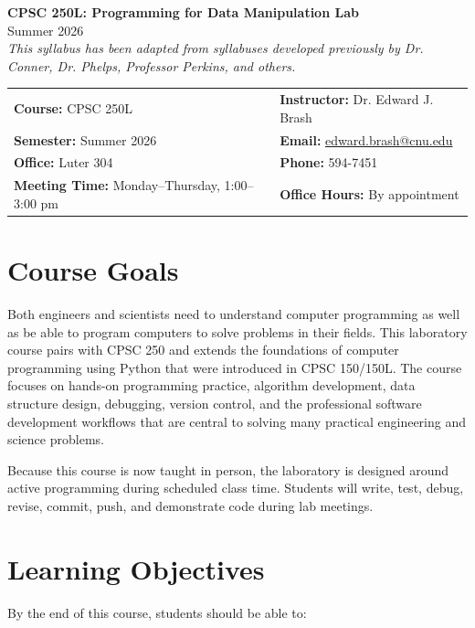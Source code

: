 \documentclass[11pt]{article}
\makeatletter
\newcommand{\coursename}{CPSC 250L: Programming for Data Manipulation Lab}
\newcommand{\semester}{Summer 2026}
\newcommand{\instructor}{Dr. Edward J. Brash}
\newcommand{\email}{edward.brash@cnu.edu}
\newcommand{\office}{Luter 304}
\newcommand{\phone}{594-7451}
\newcommand{\officehours}{By appointment}
\newcommand{\meetingtime}{Monday--Thursday, 1:00--3:00 pm}
\makeatother
\begin{document}
\begin{center}
    {\LARGE \textbf{\coursename}}\\[0.5em]
    {\large \semester}\\[0.75em]
    \textit{This syllabus has been adapted from syllabuses developed previously by Dr. Conner, Dr. Phelps, Professor Perkins, and others.}
\end{center}

\vspace{0.5em}

\begin{tabular}{@{}p{}p{}@{}}
\textbf{Course:} CPSC 250L & \textbf{Instructor:} \instructor \\
\textbf{Semester:} \semester & \textbf{Email:} \href{mailto:\email}{\email} \\
\textbf{Office:} \office & \textbf{Phone:} \phone \\
\textbf{Meeting Time:} \meetingtime & \textbf{Office Hours:} \officehours \\
\end{tabular}

\section{Course Goals}

Both engineers and scientists need to understand computer programming as well as be able to program computers to solve problems in their fields. This laboratory course pairs with CPSC 250 and extends the foundations of computer programming using Python that were introduced in CPSC 150/150L. The course focuses on hands-on programming practice, algorithm development, data structure design, debugging, version control, and the professional software development workflows that are central to solving many practical engineering and science problems.

Because this course is now taught in person, the laboratory is designed around active programming during scheduled class time. Students will write, test, debug, revise, commit, push, and demonstrate code during lab meetings.

\section{Learning Objectives}

By the end of this course, students should be able to:
\end{document}
